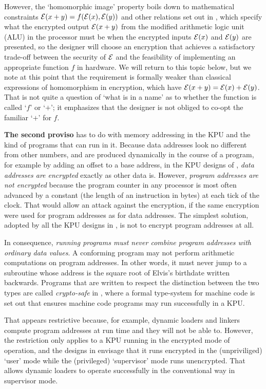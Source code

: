 \documentclass[conference]{IEEEtran}
\def\E{{\cal{E}}}
\def\para#1{{\bf{#1}}}
\begin{document}
However, the `homomorphic image' property boils down to
mathematical constraints $\E(x+y)=f(\E(x),\E(y))$ and other relations
set out in \cite{BB13a}, which specify what the encrypted output
$\E(x+y)$ from the modified arithmetic logic unit (ALU) in the processor
must be when the encrypted inputs $\E(x)$ and $\E(y)$ are presented, so
the designer will choose an encryption that achieves a satisfactory
trade-off between the security of $\E$ and the feasibility of
implementing an appropriate function $f$ in hardware.  We will return to
this topic below, but we note at this point that the requirement 
is formally weaker than classical expressions of
homomorphism in encryption, which have $\E(x+y)=\E(x)+\E(y)$.
That is not quite a question of `what is in a name' as to whether 
the function is called `$f$' or `$+$'; it emphasizes that the
designer is not obliged to co-opt the familiar `$+$' for $f$.

\para{The second proviso} has to do with memory addressing in the KPU and the
kind of programs that can run in it.  Because data addresses look no
different from other numbers, and are produced dynamically in the course
of a program, for example by adding an offset to a base address, in the
KPU designs of \cite{BB14b}, {\em data addresses are
encrypted} exactly as other data is.
However, {\em program addresses are not encrypted} because the program counter
in any processor is most often advanced by a constant (the length of an
instruction in bytes) at each tick of the clock.  That would
allow an attack against the encryption, if the same encryption were used
for program addresses as for data addresses.  The simplest solution,
adopted by all the KPU designs in \cite{BB14b}, is not to encrypt
program addresses at all.

In consequence, {\em running programs must never combine program
addresses with ordinary data values}.  A conforming program may not
perform arithmetic computations on program addresses.  In other words,
it must never jump to a subroutine whose address is the square root of
Elvis's birthdate written backwards.  Programs that are written to
respect the distinction between the two types are called {\em
crypto-safe} in \cite{BB12a}, where a formal type-system for machine
code is set out that ensures machine code programs may run successfully
in a KPU.

That appears restrictive because, for example, dynamic loaders and
linkers compute program addresses at run time and they will not be able
to.  However, the restriction only applies to a KPU running in the
encrypted mode of operation, and the designs in \cite{BB14b} envisage
that it runs encrypted in the (unpriviliged) `user' mode while the
(privileged) `supervisor' mode runs unencrypted.  That allows dynamic
loaders to operate successfully in the conventional way in supervisor
mode.
\end{document}
